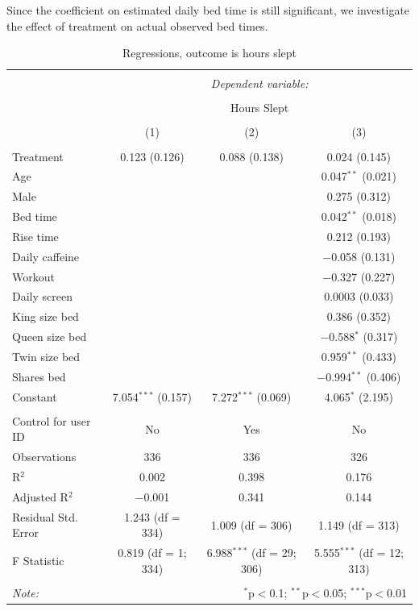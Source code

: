 \documentclass[12pt,]{article}
\begin{document}
Since the coefficient on estimated daily bed time is still significant,
we investigate the effect of treatment on actual observed bed times.

\begin{table}[!htbp] \centering 
  \caption{\label{tab:hours_regressions} Regressions, outcome is hours slept} 
  \label{} 
\begin{tabular}{@{\extracolsep{5pt}}lccc} 
\\[-1.8ex]\hline 
\hline \\[-1.8ex] 
 & \multicolumn{3}{c}{\textit{Dependent variable:}} \\ 
\cline{2-4} 
\\[-1.8ex] & \multicolumn{3}{c}{Hours Slept} \\ 
\\[-1.8ex] & (1) & (2) & (3)\\ 
\hline \\[-1.8ex] 
 Treatment & 0.123 (0.126) & 0.088 (0.138) & 0.024 (0.145) \\ 
  Age &  &  & 0.047$^{**}$ (0.021) \\ 
  Male &  &  & 0.275 (0.312) \\ 
  Bed time &  &  & 0.042$^{**}$ (0.018) \\ 
  Rise time &  &  & 0.212 (0.193) \\ 
  Daily caffeine &  &  & $-$0.058 (0.131) \\ 
  Workout &  &  & $-$0.327 (0.227) \\ 
  Daily screen &  &  & 0.0003 (0.033) \\ 
  King size bed &  &  & 0.386 (0.352) \\ 
  Queen size bed &  &  & $-$0.588$^{*}$ (0.317) \\ 
  Twin size bed &  &  & 0.959$^{**}$ (0.433) \\ 
  Shares bed &  &  & $-$0.994$^{**}$ (0.406) \\ 
  Constant & 7.054$^{***}$ (0.157) & 7.272$^{***}$ (0.069) & 4.065$^{*}$ (2.195) \\ 
 \hline \\[-1.8ex] 
Control for user ID & No & Yes & No \\ 
Observations & 336 & 336 & 326 \\ 
R$^{2}$ & 0.002 & 0.398 & 0.176 \\ 
Adjusted R$^{2}$ & $-$0.001 & 0.341 & 0.144 \\ 
Residual Std. Error & 1.243 (df = 334) & 1.009 (df = 306) & 1.149 (df = 313) \\ 
F Statistic & 0.819 (df = 1; 334) & 6.988$^{***}$ (df = 29; 306) & 5.555$^{***}$ (df = 12; 313) \\ 
\hline 
\hline \\[-1.8ex] 
\textit{Note:}  & \multicolumn{3}{r}{$^{*}$p$<$0.1; $^{**}$p$<$0.05; $^{***}$p$<$0.01} \\ 
\end{tabular} 
\end{table}
\end{document}
